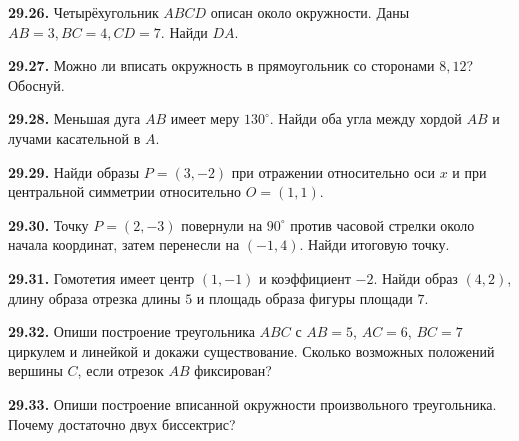 \noindent\begin{minipage}[t]{\linewidth}\textbf{29.26.} Четырёхугольник \(ABCD\) описан около окружности. Даны \(AB=3,BC=4,CD=7\). Найди \(DA\).\par\end{minipage}\par
\noindent\begin{minipage}[t]{\linewidth}\textbf{29.27.} Можно ли вписать окружность в прямоугольник со сторонами \(8,12\)? Обоснуй.\par\end{minipage}\par
\noindent\begin{minipage}[t]{\linewidth}\textbf{29.28.} Меньшая дуга \(AB\) имеет меру \(130^\circ\). Найди оба угла между хордой \(AB\) и лучами касательной в \(A\).\par\end{minipage}\par
\noindent\begin{minipage}[t]{\linewidth}\textbf{29.29.} Найди образы \(P=(3,-2)\) при отражении относительно оси \(x\) и при центральной симметрии относительно \(O=(1,1)\).\par\end{minipage}\par
\noindent\begin{minipage}[t]{\linewidth}\textbf{29.30.} Точку \(P=(2,-3)\) повернули на \(90^\circ\) против часовой стрелки около начала координат, затем перенесли на \((-1,4)\). Найди итоговую точку.\par\end{minipage}\par
\noindent\begin{minipage}[t]{\linewidth}\textbf{29.31.} Гомотетия имеет центр \((1,-1)\) и коэффициент \(-2\). Найди образ \((4,2)\), длину образа отрезка длины \(5\) и площадь образа фигуры площади \(7\).\par\end{minipage}\par
\noindent\begin{minipage}[t]{\linewidth}\textbf{29.32.}\starmark{} Опиши построение треугольника \(ABC\) с \(AB=5\), \(AC=6\), \(BC=7\) циркулем и линейкой и докажи существование. Сколько возможных положений вершины \(C\), если отрезок \(AB\) фиксирован?\par\end{minipage}\par
\noindent\begin{minipage}[t]{\linewidth}\textbf{29.33.}\starmark{} Опиши построение вписанной окружности произвольного треугольника. Почему достаточно двух биссектрис?\par\end{minipage}\par

